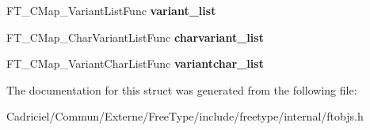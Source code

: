 \begin{DoxyCompactItemize}
\item 
F\+T\+\_\+\+C\+Map\+\_\+\+Variant\+List\+Func {\bfseries variant\+\_\+list}\hypertarget{struct_f_t___c_map___class_rec___ad61635444cbfc71c4259e74cb892c172}{}\label{struct_f_t___c_map___class_rec___ad61635444cbfc71c4259e74cb892c172}

\item 
F\+T\+\_\+\+C\+Map\+\_\+\+Char\+Variant\+List\+Func {\bfseries charvariant\+\_\+list}\hypertarget{struct_f_t___c_map___class_rec___a65db9dfa0e29b7de257dc8870532ab19}{}\label{struct_f_t___c_map___class_rec___a65db9dfa0e29b7de257dc8870532ab19}

\item 
F\+T\+\_\+\+C\+Map\+\_\+\+Variant\+Char\+List\+Func {\bfseries variantchar\+\_\+list}\hypertarget{struct_f_t___c_map___class_rec___ac1563590a0bac99082aa0996b94aad57}{}\label{struct_f_t___c_map___class_rec___ac1563590a0bac99082aa0996b94aad57}

\end{DoxyCompactItemize}


The documentation for this struct was generated from the following file\+:\begin{DoxyCompactItemize}
\item 
Cadriciel/\+Commun/\+Externe/\+Free\+Type/include/freetype/internal/ftobjs.\+h\end{DoxyCompactItemize}
